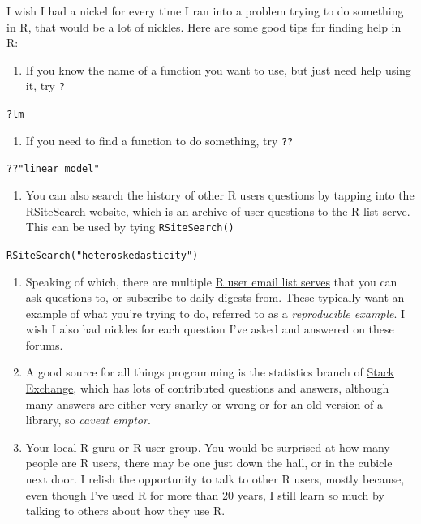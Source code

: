\documentclass[
]{article}
\providecommand{\tightlist}{%
  \setlength{\itemsep}{0pt}\setlength{\parskip}{0pt}}
\begin{document}
I wish I had a nickel for every time I ran into a problem trying to do
something in R, that would be a lot of nickles. Here are some good tips
for finding help in R:

\begin{enumerate}
\def\labelenumi{\arabic{enumi})}
\tightlist
\item
  If you know the name of a function you want to use, but just need
  help using it, try \texttt{?}
\end{enumerate}

\texttt{?lm}

\begin{enumerate}
\def\labelenumi{\arabic{enumi})}
\setcounter{enumi}{1}
\tightlist
\item
  If you need to find a function to do something, try \texttt{??}
\end{enumerate}

\texttt{??"linear\ model"}

\begin{enumerate}
\def\labelenumi{\arabic{enumi})}
\setcounter{enumi}{2}
\tightlist
\item
  You can also search the history of other R users questions by
  tapping into the
  \href{http://finzi.psych.upenn.edu/search.html}{RSiteSearch} website,
  which is an archive of user questions to the R list serve. This can
  be used by tying \texttt{RSiteSearch()}
\end{enumerate}

\texttt{RSiteSearch("heteroskedasticity")}

\begin{enumerate}
\def\labelenumi{\arabic{enumi})}
\setcounter{enumi}{3}
\item
  Speaking of which, there are multiple \href{https://www.r-project.org/mail.html}{R user email list
  serves} that you can ask
  questions to, or subscribe to daily digests from. These typically
  want an example of what you're trying to do, referred to as a
  \emph{reproducible example}. I wish I also had nickles for each question
  I've asked and answered on these forums.
\item
  A good source for all things programming is the statistics branch of
  \href{https://stats.stackexchange.com}{Stack Exchange}, which has lots of
  contributed questions and answers, although many answers are either
  very snarky or wrong or for an old version of a library, so \emph{caveat
  emptor}.
\item
  Your local R guru or R user group. You would be surprised at how
  many people are R users, there may be one just down the hall, or in
  the cubicle next door. I relish the opportunity to talk to other R
  users, mostly because, even though I've used R for more than 20
  years, I still learn so much by talking to others about how they
  use R.
\end{enumerate}
\end{document}
